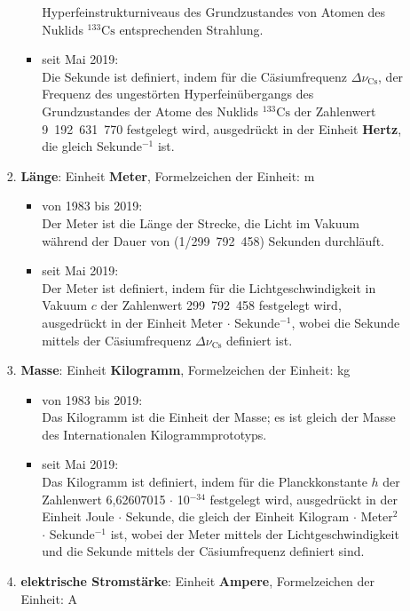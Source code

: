 \begin{raggedright}
\begin{enumerate}
\begin{itemize}
\begin{enumerate}[1.)]
\begin{itemize}
			Hyperfeinstrukturniveaus des Grundzustandes von
			Atomen des Nuklids $^{133}\mathrm{Cs}$ entsprechenden Strahlung.
			\item seit Mai 2019:\\
      Die Sekunde ist definiert, indem für die Cäsiumfrequenz
      $\Delta \nu_\mathrm{Cs}$, der Frequenz des ungestörten Hyperfeinübergangs
      des Grundzustandes der
      Atome des Nuklids $^{133}\mathrm{Cs}$ der
      Zahlenwert 9~192~631~770 festgelegt wird, ausgedrückt in der
      Einheit \textbf{Hertz},
      die gleich Sekunde$^{-1}$ ist.
			\end{itemize}
		\item \textbf{Länge}: Einheit \textbf{Meter}, Formelzeichen der Einheit: m
			\begin{itemize}
			\item von 1983 bis 2019:\\
			Der Meter ist die Länge der Strecke, die Licht im Vakuum
			während der Dauer von (1/299~792~458) Sekunden durchläuft.
			\item seit Mai 2019:\\
      Der Meter ist definiert, indem für die Lichtgeschwindigkeit in
      Vakuum $c$ der Zahlenwert 299~792~458 festgelegt wird, ausgedrückt in der 
      Einheit Meter $\cdot$ Sekunde$^{-1}$,
      wobei die Sekunde mittels der Cäsiumfrequenz
      $\Delta \nu_\mathrm{Cs}$ definiert ist.
			\end{itemize}
		\item \textbf{Masse}: Einheit \textbf{Kilogramm}, Formelzeichen der Einheit: kg
			\begin{itemize}
			\item von 1983 bis 2019:\\
			Das Kilogramm ist die Einheit der Masse;
			es ist gleich der Masse des Internationalen Kilogrammprototyps.
			\item seit Mai 2019:\\
       Das Kilogramm ist definiert, indem für die Planckkonstante $h$ der
       Zahlenwert 6,62607015 $\cdot$ 10$^{-34}$ festgelegt wird,
       ausgedrückt in der Einheit Joule $\cdot$ Sekunde, die gleich der Einheit
       Kilogram $\cdot$ Meter$^2$ $\cdot$ Sekunde$^{-1}$ ist, wobei der Meter mittels
       der Lichtgeschwindigkeit und die Sekunde mittels der Cäsiumfrequenz
       definiert sind.
			\end{itemize}
		\item \textbf{elektrische Stromstärke}: Einheit \textbf{Ampere}, Formelzeichen der Einheit: A

\end{enumerate}
\end{itemize}
\end{enumerate}
\end{raggedright}
